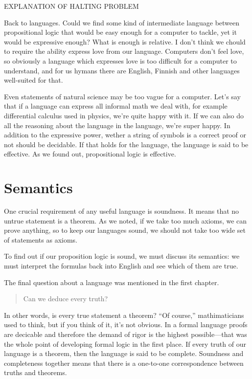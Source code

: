 \documentclass[11pt,oneside,%
]{memoir}
\theoremstyle{definition}
\begin{document}
EXPLANATION OF HALTING PROBLEM

Back to languages. Could we find some kind of intermediate language between propositional logic that would be easy enough for a computer to tackle, yet it would be expressive enough? What is enough is relative. I don't think we chould to require the ability express love from our language. Computers don't feel love, so obviously a language which expresses love is too difficult for a computer to understand, and for us hymans there are English, Finnish and other languages well-suited for that.%

Even statements of natural science may be too vague for a computer.  Let's say that if a language can express all informal math we deal with, for example differential calculus used in physics, we're quite happy with it. If we can also do all the reasoning about the language in the language, we're super happy. In addition to the expressive power, wether a string of symbols is a correct proof or not should be decidable. If that holds for the language, the language is said to be effective. As we found out, propositional logic is effective.

\section{Semantics}

One crucial requirement of any useful language is soundness. It means that no untrue statement is a theorem. As we noted, if we take too much axioms, we can prove anything, so to keep our languages sound, we should not take too wide set of statements as axioms.

To find out if our proposition logic is sound, we must discuss its semantics: we must interpret the formulas back into English and see which of them are true.

The final question about a language was mentioned in the first chapter.
\begin{quote}
    Can we deduce every truth?
\end{quote}
In other words, is every true statement a theorem? ``Of course,'' mathimaticians used to think, but if you think of it, it's not obvious. In a formal language proofs are decicable and therefore the demand of rigor is the highest possible---that was the whole point of developing formal logic in the first place. If every truth of our language is a theorem, then the language is said to be complete. Soundness and completeness together means that there is a one-to-one correspondence between truths and theorems.
\end{document}
